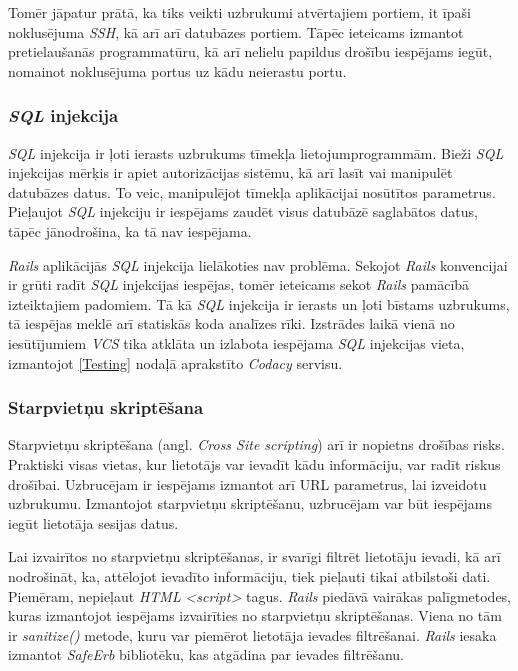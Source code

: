 Tomēr jāpatur prātā, ka tiks veikti uzbrukumi atvērtajiem portiem, it īpaši noklusējuma \textit{SSH}, kā arī arī datubāzes portiem. Tāpēc ieteicams izmantot pretielaušanās programmatūru, kā arī nelielu papildus drošību iespējams iegūt, nomainot noklusējuma portus uz kādu neierastu portu.

\subsubsection{\textit{SQL} injekcija}
\textit{SQL} injekcija ir ļoti ierasts uzbrukums tīmekļa lietojumprogrammām. Bieži \textit{SQL} injekcijas mērķis ir apiet autorizācijas sistēmu, kā arī lasīt vai manipulēt datubāzes datus. To veic, manipulējot tīmekļa aplikācijai nosūtītos parametrus. Pieļaujot \textit{SQL} injekciju ir iespējams zaudēt visus datubāzē saglabātos datus, tāpēc jānodrošina, ka tā nav iespējama.

\textit{Rails} aplikācijās \textit{SQL} injekcija lielākoties nav problēma. Sekojot \textit{Rails} konvencijai ir grūti radīt \textit{SQL} injekcijas iespējas, tomēr ieteicams sekot \textit{Rails} pamācībā \cite[security]{rails-guides} izteiktajiem padomiem. Tā kā \textit{SQL} injekcija ir ierasts un ļoti bīstams uzbrukums, tā iespējas meklē arī statiskās koda analīzes rīki. Izstrādes laikā vienā no iesūtījumiem \textit{VCS} tika atklāta un izlabota iespējama \textit{SQL} injekcijas vieta, izmantojot \ref{Testing} nodaļā aprakstīto \textit{Codacy} servisu.

\subsubsection{Starpvietņu skriptēšana}
Starpvietņu skriptēšana (angl. \textit{Cross Site scripting}) arī ir nopietns drošības risks. Praktiski visas vietas, kur lietotājs var ievadīt kādu informāciju, var radīt riskus drošībai. Uzbrucējam ir iespējams izmantot arī URL parametrus, lai izveidotu uzbrukumu. Izmantojot starpvietņu skriptēšanu, uzbrucējam var būt iespējams iegūt lietotāja sesijas datus.

Lai izvairītos no starpvietņu skriptēšanas, ir svarīgi filtrēt lietotāju ievadi, kā arī nodrošināt, ka, attēlojot ievadīto informāciju, tiek pieļauti tikai atbilstoši dati. Piemēram, nepieļaut \textit{HTML} \textit{<script>} tagus.
\textit{Rails} piedāvā vairākas palīgmetodes, kuras izmantojot iespējams izvairīties no starpvietņu skriptēšanas. Viena no tām ir \textit{sanitize()} metode, kuru var piemērot lietotāja ievades filtrēšanai. \textit{Rails} iesaka izmantot \textit{SafeErb} bibliotēku, kas atgādina par ievades filtrēšanu.

